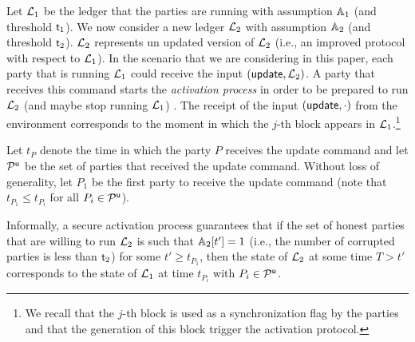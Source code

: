 Let $\mathcal{L}_1$ be the ledger that the parties are running with assumption $\mathbb{A}_1$ (and threshold $\mathsf{t}_1$). We now consider a new ledger $\mathcal{L}_2$ with assumption $\mathbb{A}_2$ (and threshold $\mathsf{t}_2$).
$\mathcal{L}_2$ represents un updated version of $\mathcal{L}_2$ (i.e., an improved protocol with respect to $\mathcal{L}_1$).
In the scenario that we are considering in this paper, each party that is running $\mathcal{L}_1$ could receive the input $(\mathsf{update}, \mathcal{L}_2)$. A party
that receives this command starts the \emph{activation process}
in order to be prepared to run $\mathcal{L}_2$ (and maybe stop running $\mathcal{L}_1$) . The receipt of the input $(\mathsf{update},\cdot)$ from the environment 
corresponds to the moment in which the $j$-th block appears in $\mathcal{L}_1$.\footnote{We recall that the $j$-th block is used as a synchronization flag by the parties
and that the generation of this block trigger the activation protocol.} 


Let $t_P$ denote the time in which 
the party $P$ receives the update command and let $\mathcal{P}^\mathsf{u}$ be the set of parties that received the update command. Without loss of generality, let $P_1$ be the first party to receive the update command (note that $t_{P_1}\leq t_{P_i}$ for all $P_i\in\mathcal{P}^\mathsf{u}$).

Informally, a secure activation process guarantees that if the set of honest parties that are willing to run $\mathcal{L}_2$ 
is such that $\mathbb{A}_2[t']=1$   (i.e., the number of corrupted parties is less
than $\mathsf{t}_2$) for some $t'\geq t_{P_1}$, then
the state of $\mathcal{L}_2$ at some time $T>t'$ corresponds to the state of $\mathcal{L}_1$ at time $t_{P_i}$ with $P_i\in\mathcal{P}^\mathsf{u}$.

 

